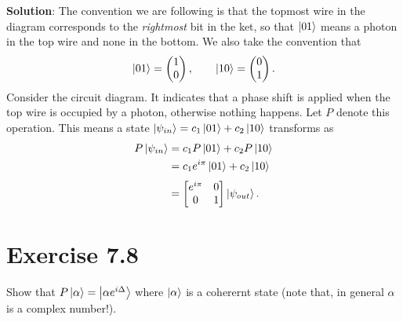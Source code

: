 \documentclass{book}
\begin{document}
    \textbf{Solution}: The convention we are following is that the topmost wire in the diagram corresponds to the \emph{rightmost} bit in the ket, so that $\ket{01}$ means a photon in the top wire and none in the bottom. We also take the convention that 
    \begin{align}
        \ket{01} = \begin{pmatrix}
            1 \\
            0
        \end{pmatrix}, \qquad \ket{10} = \begin{pmatrix}
            0 \\
            1
        \end{pmatrix}.
    \end{align}
    Consider the circuit diagram. It indicates that a phase shift is applied when the top wire is occupied by a photon, otherwise nothing happens. Let $P$ denote this operation. This means a state $\ket{\psi_{in}} = c_1 \ket{01} + c_2 \ket{10}$ transforms as
    \begin{align}
    \begin{aligned}
        P \ket{\psi_{in}} &= c_1 P \ket{01} + c_2 P \ket{10}\\ 
        &= c_1 e^{i\pi}\ket{01} + c_2 \ket{10}\\[0.7ex]
        &= \begin{bmatrix}
            e^{i\pi} & 0 \\
            0 & 1
        \end{bmatrix} \ket{\psi_{out}}.
    \end{aligned}
    \end{align}

\section*{Exercise 7.8}
    Show that $P\ket{\alpha} = \ket{\alpha e^{i\Delta}}$ where $\ket{\alpha}$ is a coherernt state (note that, in general $\alpha$ is a complex number!).
\end{document}
